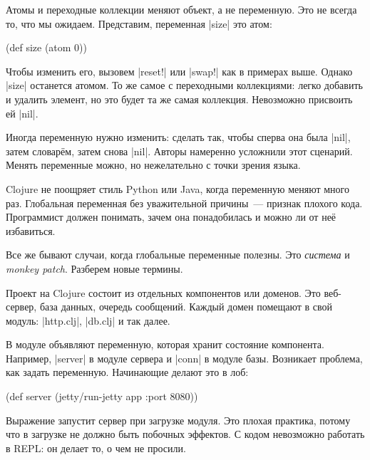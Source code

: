 \label{alter-var-root}

Атомы и переходные коллекции меняют объект, а не переменную. Это не всегда то,
что мы ожидаем. Представим, переменная \spverb|size| это атом:

\begin{english}
  \begin{clojure}
(def size (atom 0))
  \end{clojure}
\end{english}

Чтобы изменить его, вызовем \spverb|reset!| или \spverb|swap!| как в примерах
выше. Однако \spverb|size| останется атомом. То же самое с переходными
коллекциями: легко добавить и удалить элемент, но это будет та же самая
коллекция. Невозможно присвоить ей \spverb|nil|.

Иногда переменную нужно изменить: сделать так, чтобы сперва она была
\spverb|nil|, затем словар\"{е}м, затем снова \spverb|nil|. Авторы намеренно
усложнили этот сценарий. Менять переменные можно, но нежелательно с точки зрения
языка.


Clojure не поощряет стиль Python или Java, когда переменную меняют много
раз. Глобальная переменная без уважительной причины~--- признак плохого кода.
Программист должен понимать, зачем она понадобилась и можно ли от не\"{е}
избавиться.


Все же бывают случаи, когда глобальные переменные полезны. Это \emph{система} и
\emph{monkey patch}. Разберем новые термины.

Проект на Clojure состоит из отдельных компонентов или доменов. Это веб-сервер,
база данных, очередь сообщений. Каждый домен помещают в свой модуль:
\spverb|http.clj|, \spverb|db.clj| и так далее.

В модуле объявляют переменную, которая хранит состояние компонента. Например,
\spverb|server| в модуле сервера и \spverb|conn| в модуле базы. Возникает
проблема, как задать переменную. Начинающие делают это в лоб:

\begin{english}
  \begin{clojure}
(def server (jetty/run-jetty app {:port 8080}))
  \end{clojure}
\end{english}

Выражение запустит сервер при загрузке модуля. Это плохая практика, потому что в
загрузке не должно быть побочных эффектов. С кодом невозможно работать в REPL: он
делает то, о чем не просили.

